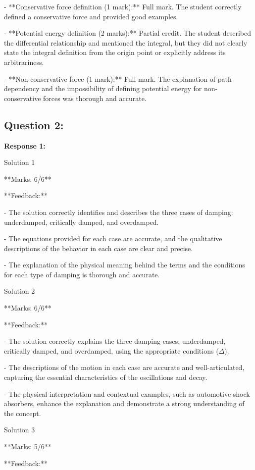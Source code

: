 \documentclass[a4paper,11pt]{article}
\begin{document}
- **Conservative force definition (1 mark):** Full mark. The student correctly defined a conservative force and provided good examples.

- **Potential energy definition (2 marks):** Partial credit. The student described the differential relationship and mentioned the integral, but they did not clearly state the integral definition from the origin point or explicitly address its arbitrariness.

- **Non-conservative force (1 mark):** Full mark. The explanation of path dependency and the impossibility of defining potential energy for non-conservative forces was thorough and accurate.

\subsection*{Question 2:}

\textbf{Response 1:}

Solution 1

**Marks: 6/6**

**Feedback:**

- The solution correctly identifies and describes the three cases of damping: underdamped, critically damped, and overdamped.

- The equations provided for each case are accurate, and the qualitative descriptions of the behavior in each case are clear and precise.

- The explanation of the physical meaning behind the terms and the conditions for each type of damping is thorough and accurate.

Solution 2

**Marks: 6/6**

**Feedback:**

- The solution correctly explains the three damping cases: underdamped, critically damped, and overdamped, using the appropriate conditions (\(\Delta\)).

- The descriptions of the motion in each case are accurate and well-articulated, capturing the essential characteristics of the oscillations and decay.

- The physical interpretation and contextual examples, such as automotive shock absorbers, enhance the explanation and demonstrate a strong understanding of the concept.

Solution 3

**Marks: 5/6**

**Feedback:**
\end{document}
